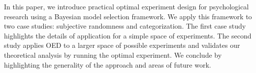 \documentclass{article}
\begin{document}
In this paper, we introduce practical optimal experiment design for psychological research using a Bayesian model selection framework. 
We apply this framework to two case studies: subjective randomness and categorization.
The first case study highlights the details of application for a simple space of experiments.
The second study applies OED to a larger space of possible experiments and validates our theoretical analysis by running the optimal experiment.
We conclude by highlighting the generality of the approach and areas of future work.


\end{document}
